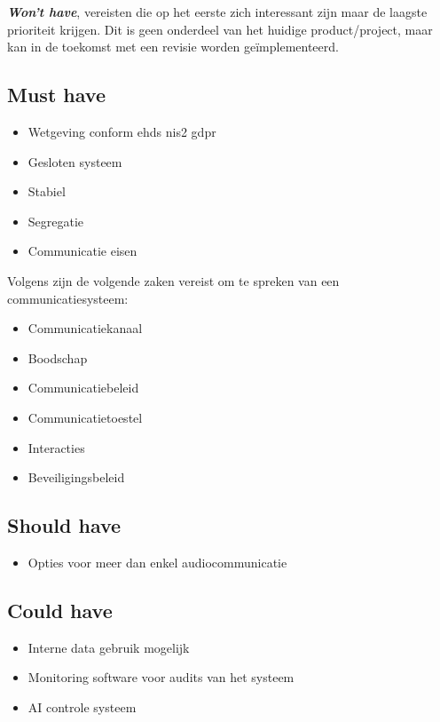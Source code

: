 \textbf{\textit{Won't have}}, vereisten die op het eerste zich interessant zijn maar de laagste prioriteit krijgen. Dit is geen onderdeel van het huidige product/project, maar kan in de toekomst met een revisie worden geïmplementeerd.\\

\subsection{Must have}
\label{sec:Must-have}

\begin{itemize}
  \item Wetgeving conform
  \subitem \gls{ehds}
  \subitem \gls{nis2}
  \subitem \gls{gdpr}
  \item Gesloten systeem
  \item Stabiel
  \item Segregatie 
  \item Communicatie eisen
\end{itemize}

Volgens \textcite{Coiera2006} zijn de volgende zaken vereist om te spreken van een communicatiesysteem:
\begin{itemize}
  \item Communicatiekanaal
  \item Boodschap
  \item Communicatiebeleid
  \item Communicatietoestel
  \item Interacties
  \item Beveiligingsbeleid
\end{itemize}

\subsection{Should have}
\label{sec:Should-have}

\begin{itemize}
  \item Opties voor meer dan enkel audiocommunicatie
\end{itemize}

\subsection{Could have}
\label{sec:Could-have}

\begin{itemize}
  \item Interne data gebruik mogelijk
  \item Monitoring software voor audits van het systeem
  \item AI controle systeem
\end{itemize}

